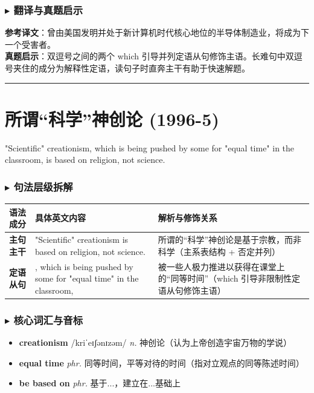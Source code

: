 \documentclass[cn,normal,11pt]{elegantnote}
\newcommand{\retrokey}[1]{{\color{accentcolor}\textbf{#1}}}
\renewcommand{\citshape}{\kaishu\fontspec{Arial}}
\begin{document}
\subsubsection*{$\blacktriangleright$ 翻译与真题启示}
\begin{remark}
  \textbf{参考译文}：曾由美国发明并处于新计算机时代核心地位的半导体制造业，将成为下一个受害者。\\
  \textbf{真题启示}：双逗号之间的两个 which 引导并列定语从句修饰主语。长难句中双逗号夹住的成分为解释性定语，读句子时直奔主干有助于快速解题。
\end{remark}

\par\vspace{10pt}\hrule\vspace{10pt}

\section{所谓“科学”神创论 (1996-5)}
\begin{note}
  "Scientific" creationism, which is being pushed by some for "equal time" in the classroom, is based on religion, not science.
\end{note}

\subsubsection*{$\blacktriangleright$ 句法层级拆解}
\noindent
\begin{tabularx}{\textwidth}{p{2.8cm} X X}
  \toprule
  \textbf{语法成分} & \textbf{具体英文内容} & \textbf{解析与修饰关系} \\
  \midrule
  \textbf{主句主干} & "Scientific" creationism is based on religion, not science. & 所谓的“科学”神创论是基于宗教，而非科学（主系表结构 + 否定并列） \\
  \midrule
  \textbf{定语从句} & , which is being pushed by some for "equal time" in the classroom, & 被一些人极力推进以获得在课堂上的“同等时间”（which 引导非限制性定语从句修饰主语） \\
  \bottomrule
\end{tabularx}

\subsubsection*{$\blacktriangleright$ 核心词汇与音标}
\begin{itemize}
  \item \retrokey{creationism} {\citshape /kriˈeɪʃənɪzəm/} \textit{n.} 神创论（认为上帝创造宇宙万物的学说）
  \item \retrokey{equal time} \textit{phr.} 同等时间，平等对待的时间（指对立观点的同等陈述时间）
  \item \retrokey{be based on} \textit{phr.} 基于...，建立在...基础上
\end{itemize}
\end{document}
